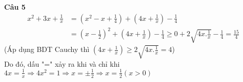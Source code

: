 \textbf{Câu 5}
\begin{align*}
  {x^2} + 3x + \frac{1}{x} &= \left( {{x^2} - x + \frac{1}{4}} \right) + \left( {4x + \frac{1}{x}} \right) - \frac{1}{4}  \\
   &= {\left( {x - \frac{1}{2}} \right)^2} + \left( {4x + \frac{1}{x}} \right) - \frac{1}{4} \geqslant 0 + 2\sqrt {4x.\frac{1}{x}}  - \frac{1}{4} = \frac{{15}}{4}  
\end{align*} 
(Áp dụng BDT Cauchy thì $\displaystyle\left( {4x +\displaystyle \frac{1}{x}} \right) \geqslant 2\sqrt {4x.\frac{1}{x}}  = 4$)\\
Do đó, dấu "=" xảy ra khi và chỉ khi $4x =\displaystyle \frac{1}{x} \Rightarrow 4{x^2} = 1 \Rightarrow x =  \pm \frac{1}{2} \Rightarrow x = \frac{1}{2}(x > 0)$
